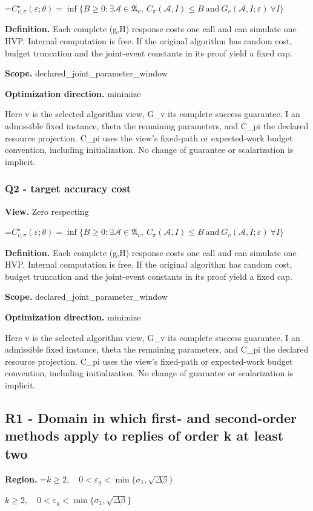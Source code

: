 \documentclass[10pt,a4paper]{article}
\newcommand{\AtlasMath}[1]{\par\begingroup\centering\setbox0=\hbox{$\displaystyle #1$}\ifdim\wd0>1.4\linewidth\typeout{ATLAS WIDE FORMULA: \the\wd0}\fi\ifdim\wd0>\linewidth\resizebox{\linewidth}{!}{\box0}\else\box0\fi\par\endgroup}
\newcommand{\AtlasInlineMath}[1]{\begingroup\setbox0=\hbox{$#1$}\ifdim\wd0>.4\linewidth\endgroup\AtlasMath{#1}\else\endgroup$#1$\fi}
\begin{document}
\AtlasMath{C^\star_{v,\pi}(\varepsilon;\theta)=\inf\{B\ge0:\exists\mathcal A\in\mathfrak A_v,\ C_\pi(\mathcal A,I)\le B\ \text{and}\ G_v(\mathcal A,I;\varepsilon)\ \forall I\}}
\textbf{Definition.} Each complete (g,H) response costs one call and can simulate one HVP. Internal computation is free. If the original algorithm has random cost, budget truncation and the joint-event constants in its proof yield a fixed cap.

\textbf{Scope.} declared\_joint\_parameter\_window

\textbf{Optimization direction.} minimize

Here v is the selected algorithm view, G\_v its complete success guarantee, I an admissible fixed instance, theta the remaining parameters, and C\_pi the declared resource projection. C\_pi uses the view's fixed-path or expected-work budget convention, including initialization. No change of guarantee or scalarization is implicit.

\subsubsection{Q2 - target accuracy cost}
\textbf{View.} Zero respecting

\AtlasMath{C^\star_{v,\pi}(\varepsilon;\theta)=\inf\{B\ge0:\exists\mathcal A\in\mathfrak A_v,\ C_\pi(\mathcal A,I)\le B\ \text{and}\ G_v(\mathcal A,I;\varepsilon)\ \forall I\}}
\textbf{Definition.} Each complete (g,H) response costs one call and can simulate one HVP. Internal computation is free. If the original algorithm has random cost, budget truncation and the joint-event constants in its proof yield a fixed cap.

\textbf{Scope.} declared\_joint\_parameter\_window

\textbf{Optimization direction.} minimize

Here v is the selected algorithm view, G\_v its complete success guarantee, I an admissible fixed instance, theta the remaining parameters, and C\_pi the declared resource projection. C\_pi uses the view's fixed-path or expected-work budget convention, including initialization. No change of guarantee or scalarization is implicit.

\subsection{R1 - Domain in which first- and second-order methods apply to replies of order k at least two}
\textbf{Region.} \AtlasInlineMath{k\ge2,\quad0<\varepsilon_g<\min\{\sigma_1,\sqrt{\Delta\beta}\}}
\end{document}
